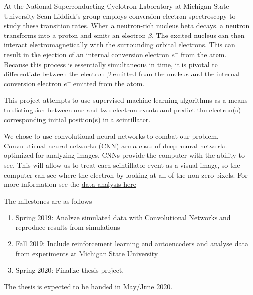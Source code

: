 \documentclass[%
oneside,                 %
final,                   %
10pt]{article}
\begin{document}
At the National Superconducting Cyclotron Laboratory at Michigan State University Sean Liddick's group employs conversion electron spectroscopy to study
these transition rates. When a neutron-rich nucleus beta decays, a
neutron transforms into a proton and emits an electron $\beta$. The
excited nucleus can then interact electromagnetically with the
surrounding orbital electrons. This can result in the ejection of an
internal conversion electron $e^{-}$ from the
\href{{https://www.sciencedirect.com/science/article/pii/S0065253908608884}}{atom}.
Because this process is essentially simultaneous in time, it is pivotal
to differentiate between the electron $\beta$ emitted from the
nucleus and the internal conversion electron $e^{-}$ emitted from
the atom.

This project attempts to use supervised machine learning algorithms as a
means to distinguish between one and two electron events and predict the
electron(s) corresponding initial position(s) in a scintillator.


We chose to use convolutional neural networks to combat our problem.
Convolutional neural networks (CNN) are a class of deep neural networks
optimized for analyzing images. CNNs provide the computer with the
ability to see. This will allow us to treat each scintillator event as a
visual image, so the computer can see where the electron by looking at
all of the non-zero pixels. 
For more information see the \href{{https://github.com/harrisonlabollita/Harrison-LaBollita/tree/master/Machine\%20Learning}}{data analysis here}

The milestones are as follows
\begin{enumerate}
\item Spring 2019: Analyze simulated data with Convolutional Networks and reproduce results from simulations

\item Fall 2019: Include reinforcement learning and autoencoders and analyse data from experiments at Michigan State University

\item Spring 2020: Finalize thesis project.
\end{enumerate}

\noindent
The thesis is expected to be handed in May/June  2020.


\end{document}
